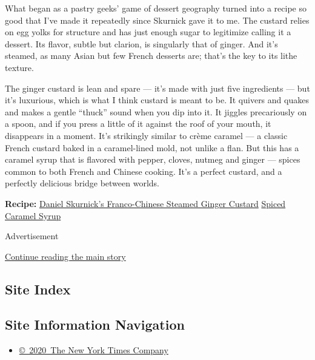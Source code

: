 What began as a pastry geeks' game of dessert geography turned into a
recipe so good that I've made it repeatedly since Skurnick gave it to
me. The custard relies on egg yolks for structure and has just enough
sugar to legitimize calling it a dessert. Its flavor, subtle but
clarion, is singularly that of ginger. And it's steamed, as many Asian
but few French desserts are; that's the key to its lithe texture.

The ginger custard is lean and spare --- it's made with just five
ingredients --- but it's luxurious, which is what I think custard is
meant to be. It quivers and quakes and makes a gentle ``thuck'' sound
when you dip into it. It jiggles precariously on a spoon, and if you
press a little of it against the roof of your mouth, it disappears in a
moment. It's strikingly similar to crème caramel --- a classic French
custard baked in a caramel-lined mold, not unlike a flan. But this has a
caramel syrup that is flavored with pepper, cloves, nutmeg and ginger
--- spices common to both French and Chinese cooking. It's a perfect
custard, and a perfectly delicious bridge between worlds.

\textbf{Recipe:}
\href{https://cooking.nytimes3xbfgragh.onion/recipes/1019459-daniel-skurnicks-franco-chinese-steamed-ginger-custard}{Daniel
Skurnick's Franco-Chinese Steamed Ginger Custard} \textbar{}
\href{https://cooking.nytimes3xbfgragh.onion/recipes/1019460-spiced-caramel-syrup}{Spiced
Caramel Syrup}

Advertisement

\protect\hyperlink{after-bottom}{Continue reading the main story}

\hypertarget{site-index}{%
\subsection{Site Index}\label{site-index}}

\hypertarget{site-information-navigation}{%
\subsection{Site Information
Navigation}\label{site-information-navigation}}

\begin{itemize}
\tightlist
\item
  \href{https://help.nytimes3xbfgragh.onion/hc/en-us/articles/115014792127-Copyright-notice}{©~2020~The
  New York Times Company}
\end{itemize}

